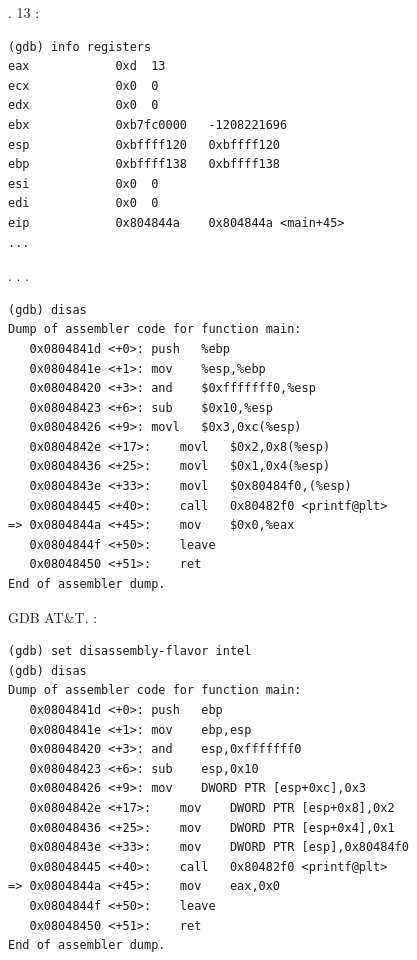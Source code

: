.
13 \InENRU \EAX:

\begin{lstlisting}
(gdb) info registers
eax            0xd	13
ecx            0x0	0
edx            0x0	0
ebx            0xb7fc0000	-1208221696
esp            0xbffff120	0xbffff120
ebp            0xbffff138	0xbffff138
esi            0x0	0
edi            0x0	0
eip            0x804844a	0x804844a <main+45>
...
\end{lstlisting}

.
.
.

\begin{lstlisting}
(gdb) disas
Dump of assembler code for function main:
   0x0804841d <+0>:	push   %ebp
   0x0804841e <+1>:	mov    %esp,%ebp
   0x08048420 <+3>:	and    $0xfffffff0,%esp
   0x08048423 <+6>:	sub    $0x10,%esp
   0x08048426 <+9>:	movl   $0x3,0xc(%esp)
   0x0804842e <+17>:	movl   $0x2,0x8(%esp)
   0x08048436 <+25>:	movl   $0x1,0x4(%esp)
   0x0804843e <+33>:	movl   $0x80484f0,(%esp)
   0x08048445 <+40>:	call   0x80482f0 <printf@plt>
=> 0x0804844a <+45>:	mov    $0x0,%eax
   0x0804844f <+50>:	leave  
   0x08048450 <+51>:	ret    
End of assembler dump.
\end{lstlisting}

 \ac{GDB}  AT\&T\ES{}.
:

\begin{lstlisting}
(gdb) set disassembly-flavor intel
(gdb) disas
Dump of assembler code for function main:
   0x0804841d <+0>:	push   ebp
   0x0804841e <+1>:	mov    ebp,esp
   0x08048420 <+3>:	and    esp,0xfffffff0
   0x08048423 <+6>:	sub    esp,0x10
   0x08048426 <+9>:	mov    DWORD PTR [esp+0xc],0x3
   0x0804842e <+17>:	mov    DWORD PTR [esp+0x8],0x2
   0x08048436 <+25>:	mov    DWORD PTR [esp+0x4],0x1
   0x0804843e <+33>:	mov    DWORD PTR [esp],0x80484f0
   0x08048445 <+40>:	call   0x80482f0 <printf@plt>
=> 0x0804844a <+45>:	mov    eax,0x0
   0x0804844f <+50>:	leave  
   0x08048450 <+51>:	ret    
End of assembler dump.
\end{lstlisting}

